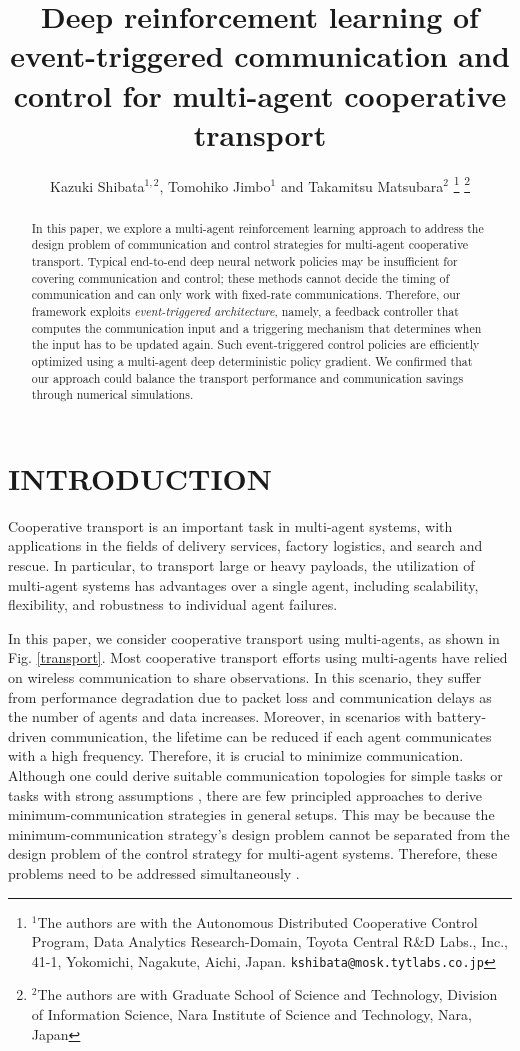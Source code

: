\documentclass[letterpaper, 10 pt, conference]{ieeeconf} %
\title{\LARGE \bf
Deep reinforcement learning of event-triggered communication and control for multi-agent cooperative transport
}
\author{Kazuki Shibata$^{1,2}$, Tomohiko Jimbo$^{1}$ and Takamitsu Matsubara$^{2}$%
\thanks{$^{1}$The authors are with the Autonomous Distributed Cooperative Control Program, Data Analytics Research-Domain, Toyota Central R$\&$D Labs., Inc., 41-1, Yokomichi, Nagakute, Aichi, Japan.
{\tt\small kshibata@mosk.tytlabs.co.jp}}%
\thanks{$^{2}$The authors are with Graduate School of Science and Technology, Division of Information Science, Nara Institute of Science and Technology, Nara, Japan
{}}%
}
\begin{document}
\maketitle
\thispagestyle{empty}
\pagestyle{empty}


\begin{abstract}
In this paper, we explore a multi-agent reinforcement learning approach to address the design problem of communication and control strategies for multi-agent cooperative transport. 
Typical end-to-end deep neural network policies may be insufficient for covering communication and control; these methods cannot decide the timing of communication and can only work with fixed-rate communications. 
Therefore, our framework exploits {\it event-triggered architecture}, namely, a feedback controller that computes the communication input and a triggering mechanism that determines when the input has to be updated again. 
Such event-triggered control policies are efficiently optimized using a multi-agent deep deterministic policy gradient. We confirmed that our approach could balance the transport performance and communication savings through numerical simulations.
\end{abstract}
\section{INTRODUCTION}
Cooperative transport is an important task in multi-agent systems, with applications in the fields of delivery services, factory logistics, and search and rescue.
In particular, to transport large or heavy payloads, the utilization of multi-agent systems has advantages over a single agent, including scalability, flexibility, and robustness to individual agent failures.

In this paper, we consider cooperative transport using multi-agents, as shown in Fig. \ref{transport}.
Most cooperative transport efforts using multi-agents \cite{Michael2011, Kennedy2015, Loianno2018} have relied on wireless communication to share observations.
In this scenario, they suffer from performance degradation due to packet loss and communication delays as the number of agents and data increases.
Moreover, in scenarios with battery-driven communication, the lifetime can be reduced if each agent communicates with a high frequency.
Therefore, it is crucial to minimize communication.
Although one could derive suitable communication topologies for simple tasks or tasks with strong assumptions \cite{Franchi2014, Franchi2015, Petitti2016, Culbertson2018}, there are few principled approaches to derive minimum-communication strategies in general setups. 
This may be because the minimum-communication strategy's design problem cannot be separated from the design problem of the control strategy for multi-agent systems. Therefore, these problems need to be addressed simultaneously \cite{Baumann2018, Funk}.
\end{document}
